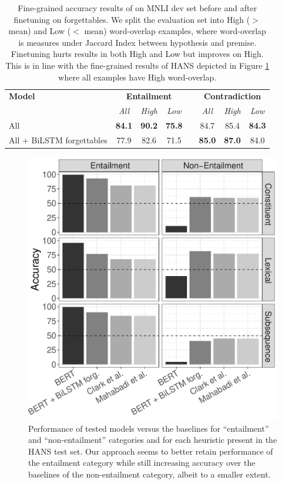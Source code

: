 \begin{table}[]
\small
\centering
\begin{tabular}{lccccccc}
\toprule
\textbf{Model} & \multicolumn{3}{c}{\textbf{Entailment}} & & \multicolumn{3}{c}{\textbf{Contradiction}} \\
& \emph{All}    & \emph{High}  & \emph{Low} & & \emph{All}     & \emph{High}    & \emph{Low} \\
\midrule
All & \textbf{84.1}   & \textbf{90.2}   & \textbf{75.8}  & & 84.7    & 85.4    & \textbf{84.3} \\
All + BiLSTM forgettables & 77.9   & 82.6   & 71.5  & & \textbf{85.0}      & \textbf{87.0} & 84.0  \\   
\bottomrule
\end{tabular}
\caption{Fine-grained accuracy results of \bertbase on MNLI dev set before and after finetuning
on forgettables. 
We split the evaluation set into High ($>$ mean) and Low ($<$ mean) word-overlap examples,
where word-overlap is measures under Jaccard Index between hypothesis and premise. 
Finetuning hurts \ent{} results in both High and Low but improves \nent{} on High.
This is in line with the fine-grained results of HANS depicted in Figure \ref{fig:fine_eval_baselines} where all examples have High word-overlap.}
\label{fine_mnli}   
\end{table}

\begin{figure}[t]
\includegraphics[scale=0.42]{figures/heuristic_plot.pdf}
\caption{Performance of tested models versus the baselines for ``entailment'' and ``non-entailment'' categories and for each heuristic present in the HANS test set. Our approach seems to better retain performance of the entailment category while still increasing accuracy over the baselines of the non-entailment category, albeit to a smaller extent.}
\label{fig:fine_eval_baselines}
\end{figure}


